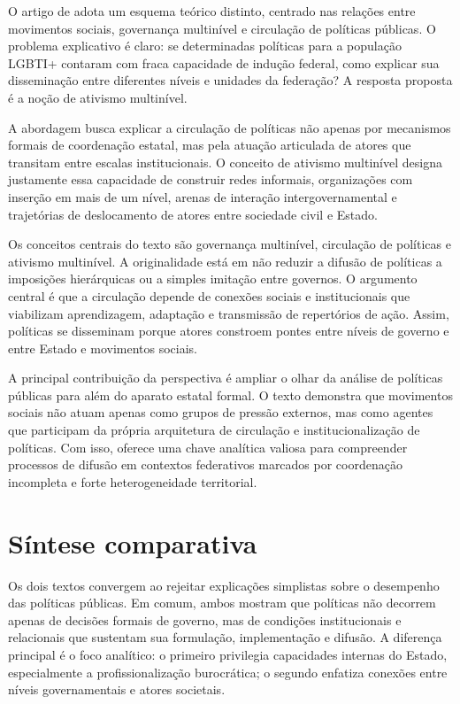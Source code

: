 \documentclass[12pt,a4paper]{article}
\begin{document}
O artigo de \textcite{pereira2025_ativismo_multinivel} adota um esquema teórico distinto, centrado nas relações entre movimentos sociais, governança multinível e circulação de políticas públicas. O problema explicativo é claro: se determinadas políticas para a população LGBTI+ contaram com fraca capacidade de indução federal, como explicar sua disseminação entre diferentes níveis e unidades da federação? A resposta proposta é a noção de ativismo multinível.

A abordagem busca explicar a circulação de políticas não apenas por mecanismos formais de coordenação estatal, mas pela atuação articulada de atores que transitam entre escalas institucionais. O conceito de ativismo multinível designa justamente essa capacidade de construir redes informais, organizações com inserção em mais de um nível, arenas de interação intergovernamental e trajetórias de deslocamento de atores entre sociedade civil e Estado.

Os conceitos centrais do texto são governança multinível, circulação de políticas e ativismo multinível. A originalidade está em não reduzir a difusão de políticas a imposições hierárquicas ou a simples imitação entre governos. O argumento central é que a circulação depende de conexões sociais e institucionais que viabilizam aprendizagem, adaptação e transmissão de repertórios de ação. Assim, políticas se disseminam porque atores constroem pontes entre níveis de governo e entre Estado e movimentos sociais.

A principal contribuição da perspectiva é ampliar o olhar da análise de políticas públicas para além do aparato estatal formal. O texto demonstra que movimentos sociais não atuam apenas como grupos de pressão externos, mas como agentes que participam da própria arquitetura de circulação e institucionalização de políticas. Com isso, oferece uma chave analítica valiosa para compreender processos de difusão em contextos federativos marcados por coordenação incompleta e forte heterogeneidade territorial.



\section{Síntese comparativa}
\label{sec:org48fa407}

Os dois textos convergem ao rejeitar explicações simplistas sobre o desempenho das políticas públicas. \parencite{marenco2017_burocracias_profissionais,pereira2025_ativismo_multinivel} Em comum, ambos mostram que políticas não decorrem apenas de decisões formais de governo, mas de condições institucionais e relacionais que sustentam sua formulação, implementação e difusão. A diferença principal é o foco analítico: o primeiro privilegia capacidades internas do Estado, especialmente a profissionalização burocrática; o segundo enfatiza conexões entre níveis governamentais e atores societais.
\end{document}
